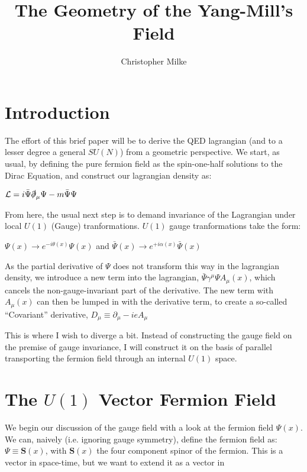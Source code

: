 \documentclass{article}
\begin{document}
\title{The Geometry of the Yang-Mill's Field}
\author{Christopher Milke}

\maketitle

\section{Introduction}
        The effort of this brief paper will be to derive the QED lagrangian (and to a lesser degree a general $SU(N)$) from a geometric perspective. We start, as usual, by defining the pure fermion field as the spin-one-half solutions to the Dirac Equation, and construct our lagrangian density as:

        $ \mathcal{L} =  i \bar{\Psi} \slashed\partial_\mu \Psi - m \bar{\Psi} \Psi   $

        From here, the usual next step is to demand invariance of the Lagrangian under local $U(1)$ (Gauge) tranformations. $U(1)$ gauge tranformations take the form: 

        $ \Psi(x) \rightarrow e^{-i \theta(x)} \Psi(x) $ and $ \bar\Psi(x) \rightarrow e^{+i \alpha(x)} \bar\Psi(x) $

        As the partial derivative of $\Psi$ does not transform this way in the lagrangian density, we introduce a new term into the lagrangian, 
        $  \bar{\Psi} \gamma^\mu \Psi A_\mu(x) $, which cancels the non-gauge-invariant part of the derivative. The new term with $A_\mu(x)$ can then be lumped in with the derivative term, to create a so-called ``Covariant'' derivative,
        $ D_\mu \equiv \partial_\mu - i e A_\mu $

        This is where I wish to diverge a bit. Instead of constructing the gauge field on the premise of gauge invariance, I will construct it on the basis of parallel transporting the fermion field through an internal $U(1)$ space.


\section{The $U(1)$ Vector Fermion Field}
        We begin our discussion of the gauge field with a look at the fermion field $\Psi(x)$. We can, naively (i.e. ignoring gauge symmetry), define the fermion field as: 
        $\Psi \equiv \mathbf{S}(x)$, with $\mathbf{S}(x)$ the four component spinor of the fermion. This is a vector in space-time, but we want to extend it as a vector in 
        
\end{document}
